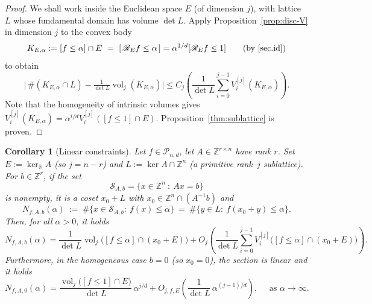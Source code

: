 \documentclass[11pt]{article}
\newtheorem{corollary}[theorem]{Corollary}
\theoremstyle{definition}
\numberwithin{equation}{section}
\newtheorem{remark}[theorem]{Remark}
\newcommand{\R}{\mathbb{R}}
\newcommand{\Z}{\mathbb{Z}}
\newcommand{\cP}{\mathcal{P}}        %
\DeclareMathOperator{\vol}{vol}
\begin{document}
\begin{proof}
We shall work inside the Euclidean space $E$ (of dimension $j$), with lattice $L$ whose fundamental domain has volume $\det L$.
Apply Proposition~\ref{prop:disc-V} in dimension $j$ to the convex body
\[
  K_{E, \alpha}
  := [f\le \alpha]\cap E \ =\ [\,\mathscr R_E f\le \alpha\,] = \alpha^{1/d} [ \mathscr R_E f \leq 1]
  \qquad\text{(by \eqref{sec.id})}
\]
to obtain
\[
  \Big|\,\#(K_{E, \alpha} \cap L)-\tfrac{1}{\det L}\vol_j(K_{E, \alpha}) \Big|
  \le C_{j}\!\left(\frac{1}{\det L}\sum_{i=0}^{j-1}V_i^{[j]}(K_{E, \alpha})\right).
\]
Note that the homogeneity of intrinsic volumes gives $V_i^{[j]}(K_{E, \alpha}) = \alpha^{i/d}V_i^{[j]}([f \leq 1] \cap E)$.
Proposition~\ref{thm:sublattice} is proven.
\end{proof}


\begin{corollary}[Linear constraints]\label{cor:linear-constraints}
Let $f \in \cP_{n, d}$, let $A\in\Z^{r\times n}$ have rank $r$.
Set $E:=\ker_\R A$ (so $j=n-r$) and ${L:=\ker A\cap\Z^n}$ (a primitive rank–$j$ sublattice). 
For $b\in\Z^r$, if the set 
\[
  \mathcal S_{A,b}  = \big\{ x\in\Z^n ~:~ Ax=b \big\}
\]
is nonempty, it is a coset $x_0+L$ with $x_0\in\Z^n\cap(A^{-1}b)$ and
\[
  N_{f,A,b}(\alpha)\ :=\ \#\{x\in\mathcal S_{A,b}:\ f(x)\le\alpha\}
  \ =\ \#\big\{y\in L:\ f(x_0+y)\le\alpha\big\}.
\]
Then, for all $\alpha>0$, it holds
\[
 N_{f,A,b}(\alpha)
  = 
  \frac{1}{\det L} \vol_j\big([f \le \alpha] \cap (x_0 + E)\big)
  + O_j 
  \left(
  \frac{1}{\det L}\sum_{i=0}^{j-1}
  V_i^{[j]}\big([f \le \alpha] \cap (x_0 + E)\big)  \right).
\]
Furthermore, in the homogeneous case $b = 0$ (so $x_0 = 0$), the section is linear and it holds
\begin{equation}\label{eq:linear-constraints-asymp}
  N_{f,A,0}(\alpha)
  = \frac{\vol_j\big([f\le 1]\cap E\big)}{\det L}\,\alpha^{j/d}
  + O_{j,f,E}\!\left(
      \frac{1}{\det L}\,\alpha^{(j-1)/d}
    \right), \quad \text{ as $\alpha \to \infty$.}
\end{equation}
\end{corollary}
\end{document}
